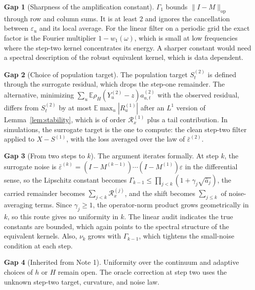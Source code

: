 \documentclass[11pt]{article}
\newcommand{\E}{\mathbb{E}}
\newcommand{\norm}[1]{\lVert#1\rVert}
\newcommand{\Signal}{X}
\newcommand{\Data}{Y}
\newcommand{\IMFs}{S}
\newcommand{\Mop}{M}
\theoremstyle{definition}
\newtheorem*{gap}{Gap}
\begin{document}
\begin{gap}[Sharpness of the amplification constant]
\(\Gamma_1\) bounds \(\norm{I-\Mop}_{\mathrm{op}}\) through row and column
sums.  It is at least \(2\) and ignores the cancellation between
\(\varepsilon_u\) and its local average.  For the linear filter on a
periodic grid the exact factor is the Fourier multiplier \(1-w_1(\omega)\),
which is small at low frequencies where the step-two kernel concentrates
its energy.  A sharper constant would need a spectral description of the
robust equivalent kernel, which is data dependent.
\end{gap}

\begin{gap}[Choice of population target]
The population target \(\IMFs^{(2)}_t\) is defined through the surrogate
residual, which drops the step-one remainder.  The alternative, minimizing
\(\sum_u\E\rho_H(\Data^{(2)}_u-z)a^{(2)}_{u,t}\) with the observed
residual, differs from \(\IMFs^{(2)}_t\) by at most
\(\E\max_u|R^{(1)}_u|\) after an \(L^1\) version of
Lemma~\ref{lem:stability}, which is of order \(\mathcal R^{(1)}_x\) plus a
tail contribution.  In simulations, the surrogate target is the one to
compute: the clean step-two filter applied to
\(\Signal-\IMFs^{(1)}\), with the loss averaged over the law of
\(\bar\varepsilon^{(2)}\).
\end{gap}

\begin{gap}[From two steps to \(k\)]
The argument iterates formally.  At step \(k\), the surrogate noise is
\(\bar\varepsilon^{(k)}=(I-\Mop^{(k-1)})\cdots(I-\Mop^{(1)})\varepsilon\)
in the differential sense, so the Lipschitz constant becomes
\(\Gamma_{k-1}\leq\prod_{j<k}(1+\gamma_j\sqrt{\bar a_j})\), the carried
remainder becomes \(\sum_{j<k}\mathcal R^{(j)}_x\), and the shift becomes
\(\sum_{j\leq k}\) of noise-averaging terms.  Since \(\gamma_j\geq1\), the
operator-norm product grows geometrically in \(k\), so this route gives no
uniformity in \(k\).  The linear audit indicates the true constants are
bounded, which again points to the spectral structure of the equivalent
kernels.  Also, \(\nu_k\) grows with \(\Gamma_{k-1}\), which tightens the
small-noise condition at each step.
\end{gap}

\begin{gap}[Inherited from Note 1]
Uniformity over the continuum and adaptive choices of \(h\) or \(H\) remain
open.  The oracle correction at step two uses the unknown step-two target,
curvature, and noise law.
\end{gap}
\end{document}
